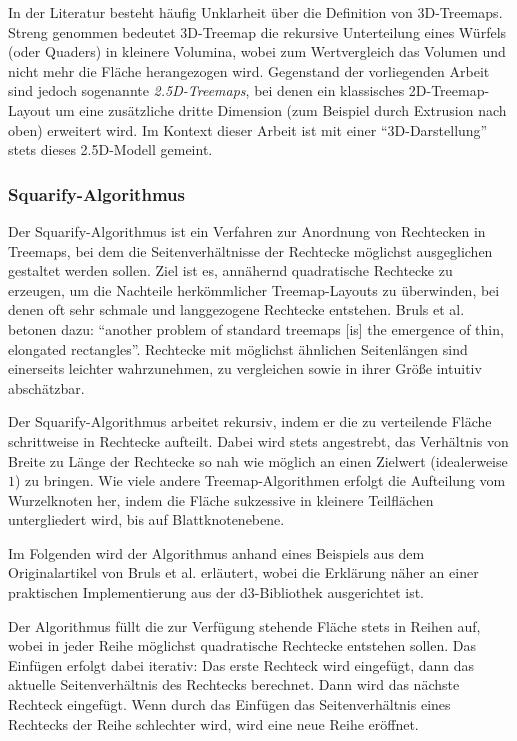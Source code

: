 \smallskip

In der Literatur besteht häufig Unklarheit über die Definition von 3D-Treemaps. Streng genommen bedeutet 3D-Treemap die rekursive Unterteilung eines Würfels (oder Quaders) in kleinere Volumina, wobei zum Wertvergleich das Volumen und nicht mehr die Fläche herangezogen wird. Gegenstand der vorliegenden Arbeit sind jedoch sogenannte \textit{2.5D-Treemaps}, bei denen ein klassisches 2D-Treemap-Layout um eine zusätzliche dritte Dimension (zum Beispiel durch Extrusion nach oben) erweitert wird. Im Kontext dieser Arbeit ist mit einer \enquote{3D-Darstellung} stets dieses 2.5D-Modell gemeint.


\subsubsection{Squarify-Algorithmus} \label{sec:Squarify}

Der Squarify-Algorithmus ist ein Verfahren zur Anordnung von Rechtecken in Treemaps, bei dem die Seitenverhältnisse der Rechtecke möglichst ausgeglichen gestaltet werden sollen. Ziel ist es, annähernd quadratische Rechtecke zu erzeugen, um die Nachteile herkömmlicher Treemap-Layouts zu überwinden, bei denen oft sehr schmale und langgezogene Rechtecke entstehen. Bruls et al. betonen dazu: 
\enquote{another problem of standard treemaps [is] the emergence of thin, elongated rectangles}\cite[1]{bruls2000squarified}. Rechtecke mit möglichst ähnlichen Seitenlängen sind einerseits leichter wahrzunehmen, zu vergleichen sowie in ihrer Größe intuitiv abschätzbar.

Der Squarify-Algorithmus arbeitet rekursiv, indem er die zu verteilende Fläche schrittweise in Rechtecke aufteilt. Dabei wird stets angestrebt, das Verhältnis von Breite zu Länge der Rechtecke so nah wie möglich an einen Zielwert (idealerweise $1$) zu bringen. Wie viele andere Treemap-Algorithmen erfolgt die Aufteilung vom Wurzelknoten her, indem die Fläche sukzessive in kleinere Teilflächen untergliedert wird, bis auf Blattknotenebene.

Im Folgenden wird der Algorithmus anhand eines Beispiels aus dem Originalartikel von Bruls et al. \cite[5]{bruls2000squarified} erläutert, wobei die Erklärung näher an einer praktischen Implementierung aus der d3-Bibliothek \cite{d3_treemap_code} ausgerichtet ist.

Der Algorithmus füllt die zur Verfügung stehende Fläche stets in Reihen auf, wobei in jeder Reihe möglichst quadratische Rechtecke entstehen sollen. Das Einfügen erfolgt dabei iterativ: Das erste Rechteck wird eingefügt, dann das aktuelle Seitenverhältnis des Rechtecks berechnet. Dann wird das nächste Rechteck eingefügt. Wenn durch das Einfügen das Seitenverhältnis eines Rechtecks der Reihe schlechter wird, wird eine neue Reihe eröffnet.

